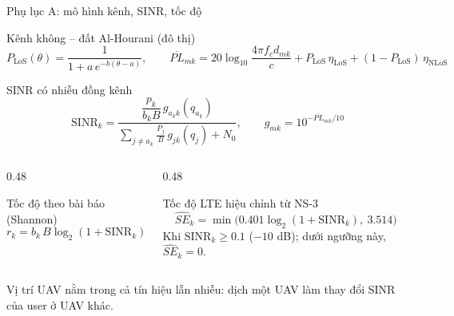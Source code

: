 \documentclass[aspectratio=169,10pt,t]{beamer}
\newcommand{\SE}{\widehat{SE}}
\begin{document}
\appendix
\begin{frame}{Phụ lục A: mô hình kênh, SINR, tốc độ}
\begin{block}{Kênh không -- đất Al-Hourani (đô thị)}
\vspace{-3mm}
\[
P_{\text{LoS}}(\theta) = \frac{1}{1 + a\,e^{-b(\theta - a)}},\qquad
\overline{PL}_{mk} = 20\log_{10}\frac{4\pi f_c d_{mk}}{c} + P_{\text{LoS}}\,\eta_{\text{LoS}} + (1-P_{\text{LoS}})\,\eta_{\text{NLoS}}
\]
\end{block}
\begin{block}{SINR có nhiễu đồng kênh}
\vspace{-3mm}
\[
\mathrm{SINR}_k = \frac{\dfrac{p_k}{b_k B}\, g_{a_k k}(q_{a_k})}{\displaystyle\sum_{j \ne a_k} \frac{P_j}{B}\, g_{jk}(q_j) + N_0},
\qquad g_{mk} = 10^{-\overline{PL}_{mk}/10}
\]
\end{block}
\begin{columns}[T,onlytextwidth]
\begin{column}{0.48\textwidth}
\vspace{0pt}
  \begin{block}{Tốc độ theo bài báo (Shannon)}
    \vspace{-2mm}
    \[ r_k = b_k\, B \log_2(1 + \mathrm{SINR}_k) \]
  \end{block}
\end{column}
\begin{column}{0.48\textwidth}
\vspace{0pt}
  \begin{block}{Tốc độ LTE hiệu chỉnh từ NS-3}
    \vspace{-2mm}
    \[ \SE_k = \min\big(0.401\log_2(1+\mathrm{SINR}_k),\ 3.514\big) \]
    \scriptsize Khi $\mathrm{SINR}_k \ge 0.1$ ($-10$ dB); dưới ngưỡng này, $\SE_k = 0$.
  \end{block}
\end{column}
\end{columns}
\scriptsize Vị trí UAV nằm trong cả tín hiệu lẫn nhiễu: dịch một UAV làm thay đổi SINR của user ở UAV khác.
\end{frame}
\end{document}
